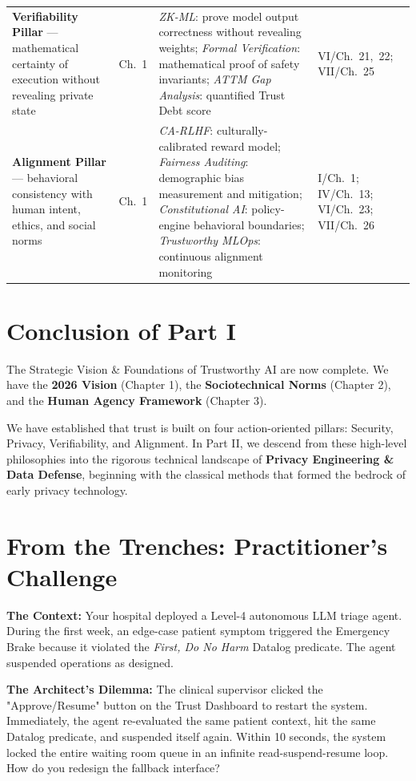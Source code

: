 \begin{longtable}{p{3.5cm} p{1.8cm} p{5.5cm} p{1.5cm}}
\textbf{Verifiability Pillar} --- mathematical certainty of execution without revealing private state &
Ch.~1 &
\textit{ZK-ML}: prove model output correctness without revealing weights; \textit{Formal Verification}: mathematical proof of safety invariants; \textit{ATTM Gap Analysis}: quantified Trust Debt score &
VI/Ch.~21,~22; VII/Ch.~25 \\[4pt]

\textbf{Alignment Pillar} --- behavioral consistency with human intent, ethics, and social norms &
Ch.~1 &
\textit{CA-RLHF}: culturally-calibrated reward model; \textit{Fairness Auditing}: demographic bias measurement and mitigation; \textit{Constitutional AI}: policy-engine behavioral boundaries; \textit{Trustworthy MLOps}: continuous alignment monitoring &
I/Ch.~1; IV/Ch.~13; VI/Ch.~23; VII/Ch.~26 \\[4pt]

\end{longtable}

\section{Conclusion of Part I}
\label{sec:conclusion_part1}

The Strategic Vision \& Foundations of Trustworthy AI are now complete. We have the \textbf{2026 Vision} (Chapter 1), the \textbf{Sociotechnical Norms} (Chapter 2), and the \textbf{Human Agency Framework} (Chapter 3). 

We have established that trust is built on four action-oriented pillars: Security, Privacy, Verifiability, and Alignment. In Part II, we descend from these high-level philosophies into the rigorous technical landscape of \textbf{Privacy Engineering \& Data Defense}, beginning with the classical methods that formed the bedrock of early privacy technology.

\section{From the Trenches: Practitioner's Challenge}
\label{sec:trenches-ch3}

\begin{tcolorbox}[challengebox, title={Scenario: The Triage Infinite Loop}]
\textbf{The Context:} 
Your hospital deployed a Level-4 autonomous LLM triage agent. During the first week, an edge-case patient symptom triggered the Emergency Brake because it violated the \textit{First, Do No Harm} Datalog predicate. The agent suspended operations as designed.

\textbf{The Architect's Dilemma:} 
The clinical supervisor clicked the "Approve/Resume" button on the Trust Dashboard to restart the system. Immediately, the agent re-evaluated the same patient context, hit the same Datalog predicate, and suspended itself again. Within 10 seconds, the system locked the entire waiting room queue in an infinite read-suspend-resume loop. How do you redesign the fallback interface?
\end{tcolorbox}


